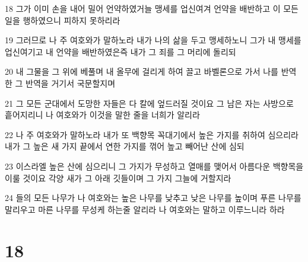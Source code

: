 \par 18 그가 이미 손을 내어 밀어 언약하였거늘 맹세를 업신여겨 언약을 배반하고 이 모든 일을 행하였으니 피하지 못하리라
\par 19 그러므로 나 주 여호와가 말하노라 내가 나의 삶을 두고 맹세하노니 그가 내 맹세를 업신여기고 내 언약을 배반하였은즉 내가 그 죄를 그 머리에 돌리되
\par 20 내 그물을 그 위에 베풀며 내 올무에 걸리게 하여 끌고 바벨론으로 가서 나를 반역한 그 반역을 거기서 국문할지며
\par 21 그 모든 군대에서 도망한 자들은 다 칼에 엎드러질 것이요 그 남은 자는 사방으로 흩어지리니 나 여호와가 이것을 말한 줄을 너희가 알리라
\par 22 나 주 여호와가 말하노라 내가 또 백향목 꼭대기에서 높은 가지를 취하여 심으리라 내가 그 높은 새 가지 끝에서 연한 가지를 꺾어 높고 빼어난 산에 심되
\par 23 이스라엘 높은 산에 심으리니 그 가지가 무성하고 열매를 맺어서 아름다운 백향목을 이룰 것이요 각양 새가 그 아래 깃들이며 그 가지 그늘에 거할지라
\par 24 들의 모든 나무가 나 여호와는 높은 나무를 낮추고 낮은 나무를 높이며 푸른 나무를 말리우고 마른 나무를 무성케 하는줄 알리라 나 여호와는 말하고 이루느니라 하라

\chapter{18}

